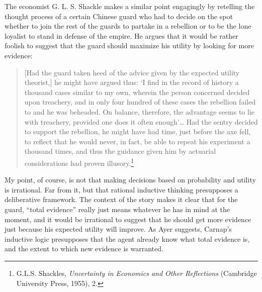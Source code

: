 The economist G. L. S. Shackle makes a similar point engagingly by
retelling the thought process of a certain Chinese guard who had to
decide on the spot whether to join the rest of the guards to
partake in a rebellion or to be the lone loyalist to stand in defense of
the empire. He argues that it would be rather foolish to suggest that
the guard should maximize his utility by looking for more evidence:

\begin{quote}
{[}Had the guard taken heed of the advice given by the expected utility
theorist,{]} he might have argued thus: `I find in the record of history
a thousand cases similar to my own, wherein the person concerned decided
upon treachery, and in only four hundred of these cases the rebellion
failed to and he was beheaded. On balance, therefore, the advantage
seems to lie with treachery, provided one does it often enough'\ldots{}
Had the sentry decided to support the rebellion, he might have had time,
just before the axe fell, to reflect that he would never, in fact, be
able to repeat his experiment a thousand times, and thus the guidance
given him by actuarial considerations had proven illusory.\footnote{G.L.S.
  Shackles, \emph{Uncertainty in Economics and Other Reflections}
  (Cambridge University Press, 1955), 2.}
\end{quote}

My point, of course, is not that making decisions based on probability
and utility is irrational. Far from it, but that rational
inductive thinking presupposes a deliberative framework. The context of
the story makes it clear that for the guard, ``total evidence'' really
just means whatever he has in mind at the moment, and it would be
irrational to suggest that he should get more evidence just because his
expected utility will improve. As Ayer suggests, Carnap's inductive logic presupposes that the agent already know what total evidence is, and the extent to which new evidence is warranted.

